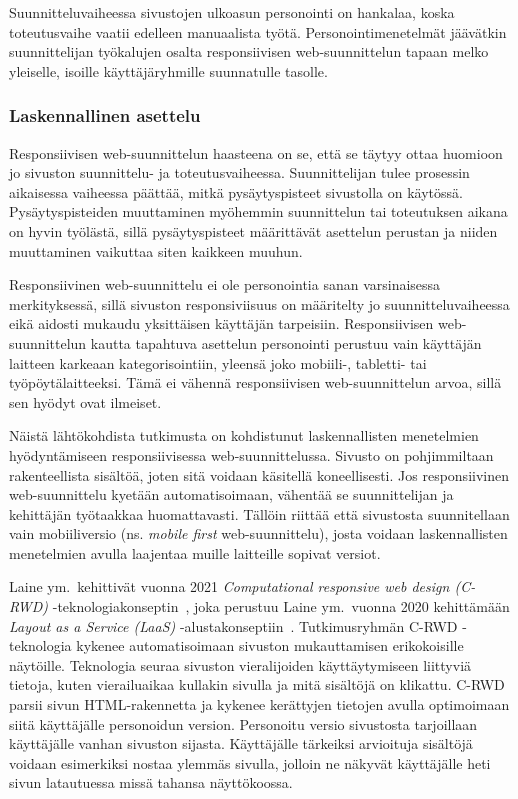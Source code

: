 \documentclass[finnish, 12pt, a4paper, elec, utf8, a-1b, online]{aaltothesis}
\begin{document}
Suunnitteluvaiheessa sivustojen ulkoasun personointi on hankalaa, koska
toteutusvaihe vaatii edelleen manuaalista työtä. Personointimenetelmät jäävätkin
suunnittelijan työkalujen osalta responsiivisen web-suunnittelun tapaan melko
yleiselle, isoille käyttäjäryhmille suunnatulle tasolle.

\subsubsection{Laskennallinen asettelu}

Responsiivisen web-suunnittelun haasteena on se, että se täytyy ottaa huomioon
jo sivuston suunnittelu- ja toteutusvaiheessa. Suunnittelijan tulee prosessin
aikaisessa vaiheessa päättää, mitkä pysäytyspisteet sivustolla on käytössä.
Pysäytyspisteiden muuttaminen myöhemmin suunnittelun tai toteutuksen aikana on
hyvin työlästä, sillä pysäytyspisteet määrittävät asettelun perustan ja niiden
muuttaminen vaikuttaa siten kaikkeen muuhun.

Responsiivinen web-suunnittelu ei ole personointia sanan varsinaisessa
merkityksessä, sillä sivuston responsiviisuus on määritelty jo
suunnitteluvaiheessa eikä aidosti mukaudu yksittäisen käyttäjän tarpeisiin.
Responsiivisen web-suunnittelun kautta tapahtuva asettelun personointi perustuu
vain käyttäjän laitteen karkeaan kategorisointiin, yleensä joko mobiili-,
tabletti- tai työpöytälaitteeksi. Tämä ei vähennä responsiivisen
web-suunnittelun arvoa, sillä sen hyödyt ovat ilmeiset.

Näistä lähtökohdista tutkimusta on kohdistunut laskennallisten menetelmien
hyödyntämiseen responsiivisessa web-suunnittelussa. Sivusto on pohjimmiltaan
rakenteellista sisältöä, joten sitä voidaan käsitellä koneellisesti. Jos
responsiivinen web-suunnittelu kyetään automatisoimaan, vähentää se
suunnittelijan ja kehittäjän työtaakkaa huomattavasti. Tällöin riittää että
sivustosta suunnitellaan vain mobiiliversio (ns. \textit{mobile first}
web-suunnittelu), josta voidaan laskennallisten menetelmien avulla laajentaa
muille laitteille sopivat versiot.

Laine ym.~kehittivät vuonna 2021 \textit{Computational responsive web design
(C-RWD)} -teknologiakonseptin~\cite{laine2021responsive}, joka perustuu Laine
ym.~vuonna 2020 kehittämään \textit{Layout as a Service (LaaS)}
-alustakonseptiin~\cite{laine2020_laas}. Tutkimusryhmän C-RWD -teknologia
kykenee automatisoimaan sivuston mukauttamisen erikokoisille näytöille.
Teknologia seuraa sivuston vieralijoiden käyttäytymiseen liittyviä tietoja,
kuten vierailuaikaa kullakin sivulla ja mitä sisältöjä on klikattu. C-RWD parsii
sivun HTML-rakennetta ja kykenee kerättyjen tietojen avulla optimoimaan siitä
käyttäjälle personoidun version. Personoitu versio sivustosta tarjoillaan
käyttäjälle vanhan sivuston sijasta. Käyttäjälle tärkeiksi arvioituja sisältöjä
voidaan esimerkiksi nostaa ylemmäs sivulla, jolloin ne näkyvät käyttäjälle heti
sivun latautuessa missä tahansa näyttökoossa.
\end{document}
